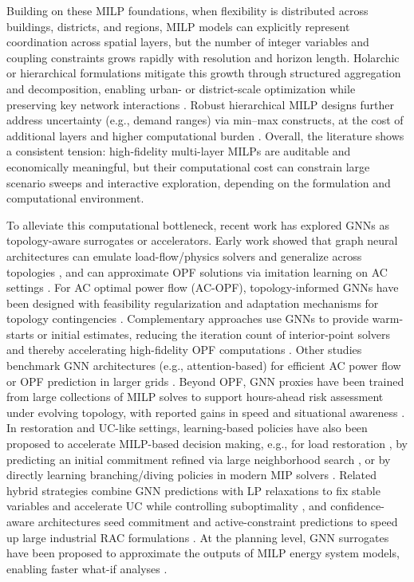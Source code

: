 \documentclass{article}
\let\parencite\citep
\begin{document}
Building on these MILP foundations, when flexibility is distributed across buildings, districts, and regions, MILP models can explicitly represent coordination across spatial layers, but the number of integer variables and coupling constraints grows rapidly with resolution and horizon length. Holarchic or hierarchical formulations mitigate this growth through structured aggregation and decomposition, enabling urban- or district-scale optimization while preserving key network interactions \parencite{marquant_holarchic_2017}. Robust hierarchical MILP designs further address uncertainty (e.g., demand ranges) via min--max constructs, at the cost of additional layers and higher computational burden \parencite{yokoyama_hierarchical_2021}. Overall, the literature shows a consistent tension: high-fidelity multi-layer MILPs are auditable and economically meaningful, but their computational cost can constrain large scenario sweeps and interactive exploration, depending on the formulation and computational environment.

To alleviate this computational bottleneck, recent work has explored GNNs as topology-aware surrogates or accelerators. Early work showed that graph neural architectures can emulate load-flow/physics solvers and generalize across topologies \parencite{donon_graph_2019}, and can approximate OPF solutions via imitation learning on AC settings \parencite{owerko_optimal_2019}. For AC optimal power flow (AC-OPF), topology-informed GNNs have been designed with feasibility regularization and adaptation mechanisms for topology contingencies \parencite{liu_topology-aware_2023}. Complementary approaches use GNNs to provide warm-starts or initial estimates, reducing the iteration count of interior-point solvers and thereby accelerating high-fidelity OPF computations \parencite{deihim_initial_2024}. Other studies benchmark GNN architectures (e.g., attention-based) for efficient AC power flow or OPF prediction in larger grids \parencite{talebi_graph_2025}. Beyond OPF, GNN proxies have been trained from large collections of MILP solves to support hours-ahead risk assessment under evolving topology, with reported gains in speed and situational awareness \parencite{zhang_graph_2024}. In restoration and UC-like settings, learning-based policies have also been proposed to accelerate MILP-based decision making, e.g., for load restoration \parencite{ahmed_advancing_2024}, by predicting an initial commitment refined via large neighborhood search \parencite{yang_solving_nodate}, or by directly learning branching/diving policies in modern MIP solvers \parencite{qin_solve_2023}. Related hybrid strategies combine GNN predictions with LP relaxations to fix stable variables and accelerate UC while controlling suboptimality \parencite{yang_stable_2025}, and confidence-aware architectures seed commitment and active-constraint predictions to speed up large industrial RAC formulations \parencite{park_confidence-aware_2023}. At the planning level, GNN surrogates have been proposed to approximate the outputs of MILP energy system models, enabling faster what-if analyses \parencite{pjetri_graph_nodate}.
\end{document}
